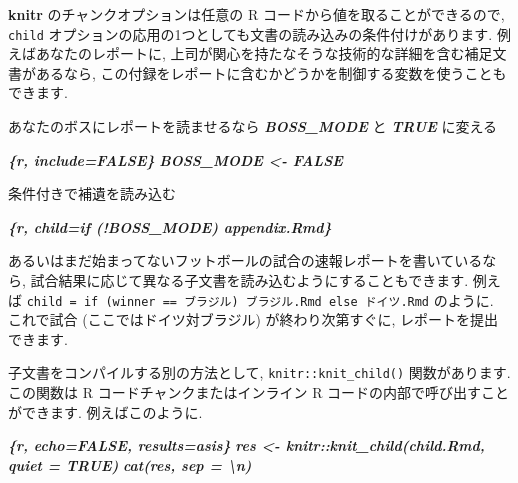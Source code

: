 \documentclass[
  11pt,
]{bxjsreport}
\newenvironment{Shaded}{\begin{snugshade}}{\end{snugshade}}
\newcommand{\InformationTok}[1]{\textcolor[rgb]{0.56,0.35,0.01}{\textbf{\textit{#1}}}}
\newcommand{\NormalTok}[1]{#1}
\begin{document}
\textbf{knitr} のチャンクオプションは任意の R コードから値を取ることができるので, \texttt{child} オプションの応用の1つとしても文書の読み込みの条件付けがあります. 例えばあなたのレポートに, 上司が関心を持たなそうな技術的な詳細を含む補足文書があるなら, この付録をレポートに含むかどうかを制御する変数を使うこともできます.

\begin{Shaded}
\begin{Highlighting}[]
\NormalTok{あなたのボスにレポートを読ませるなら }\InformationTok{\textasciigrave{}BOSS\_MODE\textasciigrave{}}\NormalTok{ と }\InformationTok{\textasciigrave{}TRUE\textasciigrave{}}\NormalTok{ に変える}

\InformationTok{\textasciigrave{}\textasciigrave{}\textasciigrave{}\{r, include=FALSE\}}
\InformationTok{BOSS\_MODE \textless{}{-} FALSE}
\InformationTok{\textasciigrave{}\textasciigrave{}\textasciigrave{}}

\NormalTok{条件付きで補遺を読み込む}

\InformationTok{\textasciigrave{}\textasciigrave{}\textasciigrave{}\{r, child=if (!BOSS\_MODE) \textquotesingle{}appendix.Rmd\textquotesingle{}\}}
\InformationTok{\textasciigrave{}\textasciigrave{}\textasciigrave{}}
\end{Highlighting}
\end{Shaded}

あるいはまだ始まってないフットボールの試合の速報レポートを書いているなら, 試合結果に応じて異なる子文書を読み込むようにすることもできます. 例えば \texttt{child = if (winner == \textquotesingle{}ブラジル\textquotesingle{})\ \textquotesingle{}ブラジル.Rmd\textquotesingle{}\ else\ \textquotesingle{}ドイツ.Rmd\textquotesingle{}} のように. これで試合 (ここではドイツ対ブラジル) が終わり次第すぐに, レポートを提出できます.

子文書をコンパイルする別の方法として, \texttt{knitr::knit\_child()} 関数があります. この関数は R コードチャンクまたはインライン R コードの内部で呼び出すことができます. 例えばこのように.

\begin{Shaded}
\begin{Highlighting}[]
\InformationTok{\textasciigrave{}\textasciigrave{}\textasciigrave{}\{r, echo=FALSE, results=\textquotesingle{}asis\textquotesingle{}\}}
\InformationTok{res \textless{}{-} knitr::knit\_child(\textquotesingle{}child.Rmd\textquotesingle{}, quiet = TRUE)}
\InformationTok{cat(res, sep = \textquotesingle{}\textbackslash{}n\textquotesingle{})}
\InformationTok{\textasciigrave{}\textasciigrave{}\textasciigrave{}}
\end{Highlighting}
\end{Shaded}
\end{document}
